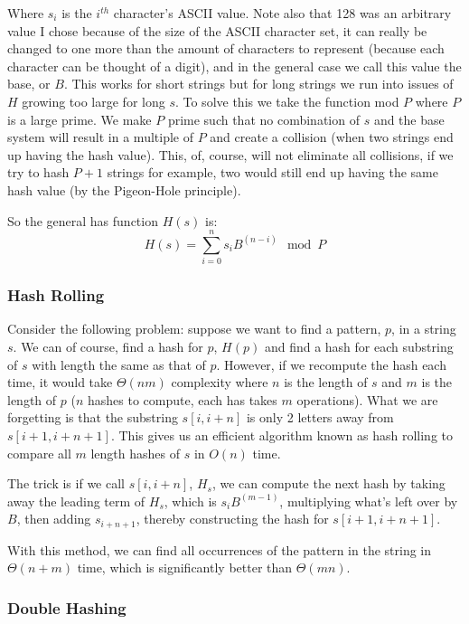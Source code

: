 \documentclass[12 pt, twoside] {article}
\begin{document}
{Where $s_i$ is the $i^{th}$ character's ASCII value. Note also that 128 was an
arbitrary value I chose because of the size of the ASCII character set, it can
really be changed to one more than the amount of characters to represent
(because each character can be thought of a digit), and in the general case we
call this value the base, or $B$. This works for short strings but for long
strings we run into issues of $H$ growing too large for long $s$. To solve this
we take the function mod $P$ where $P$ is a large prime.  We make $P$ prime such
that no combination of $s$ and the base system will result in a multiple of $P$
and create a collision (when two strings end up having the hash value). This,
of, course, will not eliminate all collisions, if we try to hash $P + 1$ strings
for example, two would still end up having the same hash value (by the
Pigeon-Hole principle).

So the general has function $H(s)$ is:
\[
    \boxed{H(s) = \sum_{i=0}^n s_i B^{(n - i)} \mod P}
\]

\subsubsection*{Hash Rolling}

Consider the following problem: suppose we want to find a pattern, $p$, in a
string $s$. We can of course, find a hash for $p$, $H(p)$ and find a hash for
each substring of $s$ with length the same as that of $p$. However, if we
recompute the hash each time, it would take $\Theta(nm)$ complexity where $n$ is
the length of $s$ and $m$ is the length of $p$ ($n$ hashes to compute, each has
takes $m$ operations). What we are forgetting is that the substring $s[i, i+n]$
is only 2 letters away from $s[i+1, i+n+1]$. This gives us an efficient
algorithm known as hash rolling to compare all $m$ length hashes of $s$ in
$O(n)$ time.

The trick is if we call $s[i, i+n]$, $H_s$, we can compute the next hash by
taking away the leading term of $H_s$, which is $s_i B^{(m - 1)}$, multiplying
what's left over by $B$, then adding $s_{i+n+1}$, thereby constructing the hash
for $s[i + 1, i + n + 1]$.

With this method, we can find all occurrences of the pattern in the string in
$\Theta(n + m)$ time, which is significantly better than $\Theta(mn)$.

\subsubsection*{Double Hashing}

}
\end{document}
